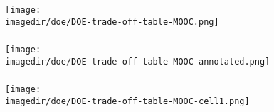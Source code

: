 \begin{comment}
	
	
	\begin{frame}\frametitle{\texttt{[image: \\imagedir/doe/examples/advice-logo.png]}\,\, plan your experiments carefully ahead of time}
	\end{frame}
	
	\begin{columns}[T]
		\column{0.45\textwidth}
			\texttt{[image: \\imagedir/statistics/flicfcb\_o.jpg]}
		
			{\scriptsize (p. 230 in Box, Hunter and Hunter, 2$^\text{nd}$ ed)}
		
		\column{0.48\textwidth}
			\texttt{[image: \\imagedir/doe/examples/solar-panel-mendelu-cz-website.png]}
		
		
			\see{\href{http://yint.org/solar-panel-study}{http://yint.org/solar-panel-study}}
	\end{columns}
	
	\begin{center}\rule[8mm]{4cm}{0.01cm}\end{center}
	\rule[3mm]{0.01cm}{25mm}%

\end{comment}
\begin{frame}\frametitle{}
	\begin{center}
	\texttt{[image: \\imagedir/doe/DOE-trade-off-table-MOOC.png]}
	\end{center}
\end{frame}

\begin{frame}\frametitle{}
	\begin{center}
	\texttt{[image: \\imagedir/doe/DOE-trade-off-table-MOOC-annotated.png]}
	\end{center}
\end{frame}

\begin{frame}\frametitle{}
	\begin{center}
	\texttt{[image: \\imagedir/doe/DOE-trade-off-table-MOOC-cell1.png]}
	\end{center}
\end{frame}

